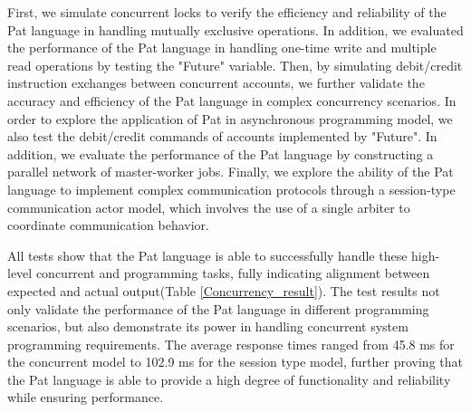 \documentclass{l4proj}
\begin{document}
First, we simulate concurrent locks to verify the efficiency and reliability of the Pat language in handling mutually exclusive operations. In addition, we evaluated the performance of the Pat language in handling one-time write and multiple read operations by testing the "Future" variable. Then, by simulating debit/credit instruction exchanges between concurrent accounts, we further validate the accuracy and efficiency of the Pat language in complex concurrency scenarios. In order to explore the application of Pat in asynchronous programming model, we also test the debit/credit commands of accounts implemented by "Future". In addition, we evaluate the performance of the Pat language by constructing a parallel network of master-worker jobs. Finally, we explore the ability of the Pat language to implement complex communication protocols through a session-type communication actor model, which involves the use of a single arbiter to coordinate communication behavior.

All tests show that the Pat language is able to successfully handle these high-level concurrent and programming tasks, fully indicating alignment between expected and actual output(Table \ref{Concurrency_result}). The test results not only validate the performance of the Pat language in different programming scenarios, but also demonstrate its power in handling concurrent system programming requirements. The average response times ranged from 45.8 ms for the concurrent model to 102.9 ms for the session type model, further proving that the Pat language is able to provide a high degree of functionality and reliability while ensuring performance.
\begin{table}[ht]
\centering
\renewcommand{\arraystretch}{1.1}
\caption{Advanced Concurrency Model Correct Test Results}
\label{Concurrency_result}
\end{table}
\end{document}
